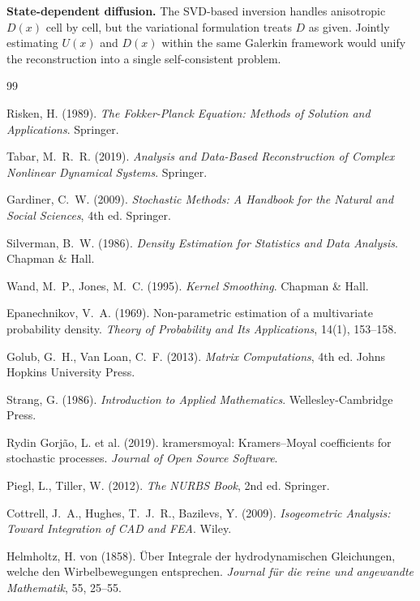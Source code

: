 \documentclass[11pt,a4paper]{article}
\begin{document}
\textbf{State-dependent diffusion.} The SVD-based inversion handles
anisotropic $D(x)$ cell by cell, but the variational formulation treats $D$ as
given. Jointly estimating $U(x)$ and $D(x)$ within the same Galerkin framework
would unify the reconstruction into a single self-consistent problem.

\begin{thebibliography}{99}

Risken, H. (1989). \emph{The Fokker-Planck Equation: Methods of Solution and
Applications}. Springer.

Tabar, M.~R.~R. (2019). \emph{Analysis and Data-Based Reconstruction of
Complex Nonlinear Dynamical Systems}. Springer.

Gardiner, C.~W. (2009). \emph{Stochastic Methods: A Handbook for the Natural
and Social Sciences}, 4th ed. Springer.

Silverman, B.~W. (1986). \emph{Density Estimation for Statistics and Data
Analysis}. Chapman \& Hall.

Wand, M.~P., Jones, M.~C. (1995). \emph{Kernel Smoothing}. Chapman \& Hall.

Epanechnikov, V.~A. (1969). Non-parametric estimation of a multivariate
probability density. \emph{Theory of Probability and Its Applications}, 14(1),
153--158.

Golub, G.~H., Van Loan, C.~F. (2013). \emph{Matrix Computations}, 4th ed.
Johns Hopkins University Press.

Strang, G. (1986). \emph{Introduction to Applied Mathematics}.
Wellesley-Cambridge Press.

Rydin Gorj\~ao, L. et al. (2019). kramersmoyal: Kramers--Moyal coefficients
for stochastic processes. \emph{Journal of Open Source Software}.

Piegl, L., Tiller, W. (2012). \emph{The NURBS Book}, 2nd ed. Springer.

Cottrell, J.~A., Hughes, T.~J.~R., Bazilevs, Y. (2009). \emph{Isogeometric
Analysis: Toward Integration of CAD and FEA}. Wiley.

Helmholtz, H. von (1858). \"Uber Integrale der hydrodynamischen Gleichungen,
welche den Wirbelbewegungen entsprechen. \emph{Journal f\"ur die reine und
angewandte Mathematik}, 55, 25--55.


\end{thebibliography}
\end{document}
